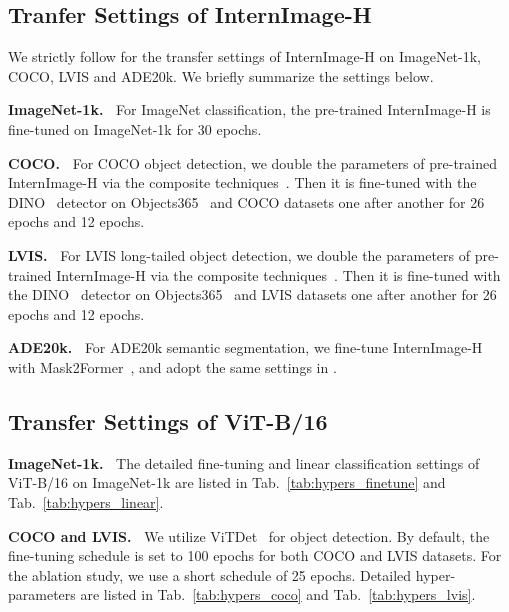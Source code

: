 \documentclass[10pt,twocolumn,letterpaper]{article}
\begin{document}
\subsection{Tranfer Settings of InternImage-H}

We strictly follow \cite{anonymous2022internimg} for the transfer settings of InternImage-H on ImageNet-1k, COCO, LVIS and ADE20k. We briefly summarize the settings below.

\vspace{0.5em}\noindent\textbf{ImageNet-1k.~} For ImageNet classification, the pre-trained InternImage-H is fine-tuned on ImageNet-1k for 30 epochs.

\vspace{0.5em}\noindent\textbf{COCO.~} For COCO object detection, we double the parameters of pre-trained InternImage-H via the composite techniques~\cite{liang2022cbnet}. Then it is fine-tuned with the DINO~\cite{zhang2022dino} detector on Objects365~\cite{shao2019objects365} and COCO datasets one after another for 26 epochs and 12 epochs.

\vspace{0.5em}\noindent\textbf{LVIS.~} For LVIS long-tailed object detection, we double the parameters of pre-trained InternImage-H via the composite techniques~\cite{liang2022cbnet}. Then it is fine-tuned with the DINO~\cite{zhang2022dino} detector on Objects365~\cite{shao2019objects365} and LVIS datasets one after another for 26 epochs and 12 epochs.

\vspace{0.5em}\noindent\textbf{ADE20k.~} For ADE20k semantic segmentation, we fine-tune InternImage-H with Mask2Former~\cite{cheng2021masked}, and adopt the same settings in \cite{wang2022image,chen2022vitadapter}. 

\subsection{Transfer Settings of ViT-B/16}

\noindent\textbf{ImageNet-1k.~} The detailed fine-tuning and linear classification settings of ViT-B/16 on ImageNet-1k are listed in Tab.~\ref{tab:hypers_finetune} and Tab.~\ref{tab:hypers_linear}. 

\vspace{0.5em}\noindent\textbf{COCO and LVIS.~} We utilize ViTDet~\cite{li2022exploring} for object detection. By default, the fine-tuning schedule is set to 100 epochs for both COCO and LVIS datasets. For the ablation study, we use a short schedule of 25 epochs. Detailed hyper-parameters are listed in Tab.~\ref{tab:hypers_coco} and Tab.~\ref{tab:hypers_lvis}.
\end{document}
